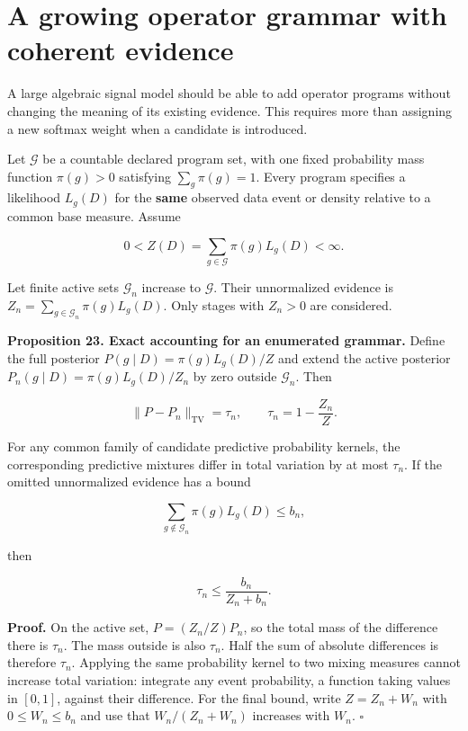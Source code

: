 \section{A growing operator grammar with coherent evidence}\label{LSM:a-growing-operator-grammar-with-coherent-evidence}

A large algebraic signal model should be able to add operator programs
without changing the meaning of its existing evidence. This requires
more than assigning a new softmax weight when a candidate is introduced.

Let \(\mathcal G\) be a countable declared program set, with one fixed
probability mass function \(\pi(g)>0\) satisfying \(\sum_g\pi(g)=1\).
Every program specifies a likelihood \(L_g(D)\) for the \textbf{same}
observed data event or density relative to a common base measure. Assume

\[
0<Z(D)=\sum_{g\in\mathcal G}\pi(g)L_g(D)<\infty.
\]

Let finite active sets \(\mathcal G_n\) increase to \(\mathcal G\).
Their unnormalized evidence is
\(Z_n=\sum_{g\in\mathcal G_n}\pi(g)L_g(D)\). Only stages with \(Z_n>0\)
are considered.

\textbf{Proposition 23. Exact accounting for an enumerated grammar.}
Define the full posterior \(P(g\mid D)=\pi(g)L_g(D)/Z\) and extend the
active posterior \(P_n(g\mid D)=\pi(g)L_g(D)/Z_n\) by zero outside
\(\mathcal G_n\). Then

\[
\boxed{
\|P-P_n\|_{\mathrm{TV}}=\tau_n,
\qquad \tau_n=1-\frac{Z_n}{Z}.
}
\]

For any common family of candidate predictive probability kernels, the
corresponding predictive mixtures differ in total variation by at most
\(\tau_n\). If the omitted unnormalized evidence has a bound

\[
\sum_{g\notin\mathcal G_n}\pi(g)L_g(D)\leq b_n,
\]

then

\[
\tau_n\leq\frac{b_n}{Z_n+b_n}.
\]

\textbf{Proof.} On the active set, \(P=(Z_n/Z)P_n\), so the total mass
of the difference there is \(\tau_n\). The mass outside is also
\(\tau_n\). Half the sum of absolute differences is therefore
\(\tau_n\). Applying the same probability kernel to two mixing measures
cannot increase total variation: integrate any event probability, a
function taking values in \([0,1]\), against their difference. For the
final bound, write \(Z=Z_n+W_n\) with \(0\leq W_n\leq b_n\) and use that
\(W_n/(Z_n+W_n)\) increases with \(W_n\). \(\square\)

